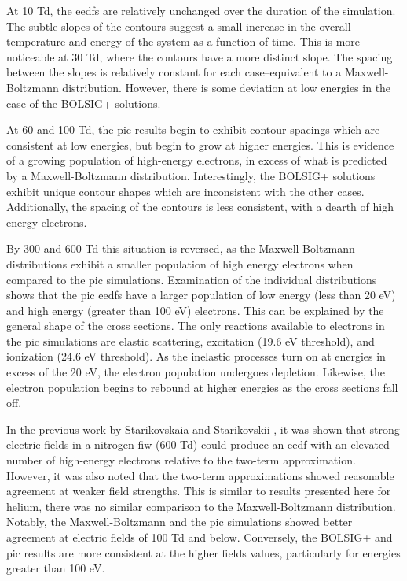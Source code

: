 At 10 Td, the \acs{eedf}s are relatively unchanged over the duration of the
simulation. The subtle slopes of the contours suggest a small increase in the
overall temperature and energy of the system as a function of time. This is more
noticeable at 30 Td, where the contours have a more distinct slope. The spacing
between the slopes is relatively constant for each case--equivalent to a
Maxwell-Boltzmann distribution. However, there is some deviation at low energies
in the case of the BOLSIG+ solutions.

At 60 and 100 Td, the \acs{pic} results begin to exhibit contour spacings which
are consistent at low energies, but begin to grow at higher energies. This is
evidence of a growing population of high-energy electrons, in excess of what is
predicted by a Maxwell-Boltzmann distribution. Interestingly, the BOLSIG+
solutions exhibit unique contour shapes which are inconsistent with the other
cases. Additionally, the spacing of the contours is less consistent, with a
dearth of high energy electrons. 

By 300 and 600 Td this situation is reversed, as the Maxwell-Boltzmann
distributions exhibit a smaller population of high energy electrons when
compared to the \acs{pic} simulations. Examination of the individual
distributions shows that the \acs{pic} \acs{eedf}s have a larger population of
low energy (less than 20 eV) and high energy (greater than 100 eV) electrons.
This can be explained by the general shape of the cross sections. The only
reactions available to electrons in the \acs{pic} simulations are elastic
scattering, excitation (19.6 eV threshold), and ionization (24.6 eV threshold).
As the inelastic processes turn on at energies in excess of the 20 eV, the
electron population undergoes depletion. Likewise, the electron population
begins to rebound at higher energies as the cross sections fall off.

In the previous work by Starikovskaia and Starikovskii \cite{Starikovskaia2001a},
it was shown that strong electric fields in a nitrogen \acs{fiw} (600 Td) could
produce an \acs{eedf} with an elevated number of high-energy electrons relative
to the two-term approximation. However, it was also noted that the two-term
approximations showed reasonable agreement at weaker field strengths. This is
similar to results presented here for helium, there was no similar comparison to
the Maxwell-Boltzmann distribution. Notably, the Maxwell-Boltzmann and the
\acs{pic} simulations showed better agreement at electric fields of 100 Td
and below. Conversely, the BOLSIG+ and \acs{pic} results are more consistent at
the higher fields values, particularly for energies greater than 100 eV.

